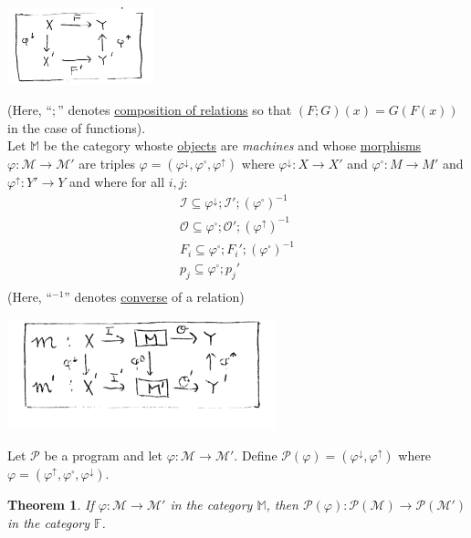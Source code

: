 \documentclass{article}
\newtheorem{theorem}{Theorem}
\newcommand{\scM}{\mathscr{M}}
\newcommand{\scP}{\mathscr{P}}
\newcommand{\mcI}{\mathcal{I}}
\newcommand{\mcO}{\mathcal{O}}
\newcommand{\ff}{\mathbb{F}}
\newcommand{\mm}{\mathbb{M}}
\begin{document}
\begin{center}
    \includegraphics[width=120pt]{dg4.png}
\end{center}


(Here, ``$;$'' denotes \underline{composition of relations} so that $(F;G)(x) = G(F(x))$ in the case of functions). \\

Let $\mm$ be the category whoste \underline{objects} are \textit{machines} and whose \underline{morphisms} $\varphi: \scM \to \scM'$ are triples $\varphi = (\varphi^\downarrow, \varphi^\square, \varphi^\uparrow)$ where $\varphi^\downarrow : X \to X'$ and $\varphi^\square: M \to M'$ and $\varphi^\uparrow : Y' \to Y$ and where for all $i, j$:
\begin{gather*}
    \mcI \subseteq \varphi^\downarrow; \mcI'; (\varphi^\square)^{-1} \\
    \mcO \subseteq \varphi^\square; \mcO'; (\varphi^\uparrow)^{-1} \\
    F_i \subseteq \varphi^\square; F_i'; (\varphi^\square)^{-1} \\ 
    p_j \subseteq \varphi^\square; p_j' \\
\end{gather*}
(Here, ``$\mbox{}^{-1}$'' denotes \underline{converse} of a relation) \\ 

\begin{center}
    \includegraphics[width=220pt]{dg5.png}
\end{center}

Let $\scP$ be a program and let $\varphi : \scM \to \scM'$. Define $\scP(\varphi) = (\varphi^\downarrow, \varphi^\uparrow)$ where $\varphi = (\varphi^\uparrow, \varphi^\square, \varphi^\downarrow)$. 
\begin{theorem}
    If $\varphi : \scM \to \scM'$ in the category $\mm$, then $\scP(\varphi): \scP(\scM) \to \scP(\scM')$ in the category $\ff$.
\end{theorem}
\end{document}
